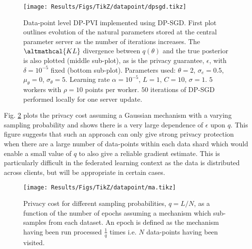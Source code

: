 \begin{figure}
	\texttt{[image: Results/Figs/TikZ/datapoint/dpsgd.tikz]}
	\centering
	\caption{\label{fig:results-dpsgd} Data-point level DP-PVI implemented using  DP-SGD. First plot outlines evolution of the natural parameters stored at the central parameter server as the number of iterations increases. The $\altmathcal{KL}$ divergence between $q(\theta)$ and the true posterior is also plotted (middle sub-plot), as is the privacy guarantee, $\epsilon$, with $\delta = 10^{-5}$ fixed (bottom sub-plot). Parameters used: $\theta=2$, $\sigma_e=0.5$, $\mu_\theta = 0$, $\sigma_\theta = 5$. Learning rate $\alpha = 10^{-5}$, $L = 1$, $C=10$, $\sigma=1$. $5$ workers with $\rho = 10$ points per worker. $50$ iterations of DP-SGD performed locally for one server update. }
\end{figure}

Fig. \ref{fig:results-ma} plots the privacy cost assuming a Gaussian mechanism with a varying sampling probability and shows there is a very large dependence of $\epsilon$ upon $q$. This figure suggests that such an approach can only give strong privacy protection when there are a large number of data-points within each data shard which would enable a small value of $q$ to also give a reliable gradient estimate. This is particularly difficult in the federated learning context as the data is distributed across clients, but will be appropriate in certain cases. 

\begin{figure}
	\texttt{[image: Results/Figs/TikZ/datapoint/ma.tikz]}
	\centering
	\caption{\label{fig:results-ma}  Privacy cost for different sampling probabilities, $q = L / N$, as a function of the number of epochs assuming a mechanism which sub-samples from each dataset. An epoch is defined as the mechanism having been run processed $\frac{1}{q}$ times i.e. $N$ data-points having been visited. }
\end{figure}

